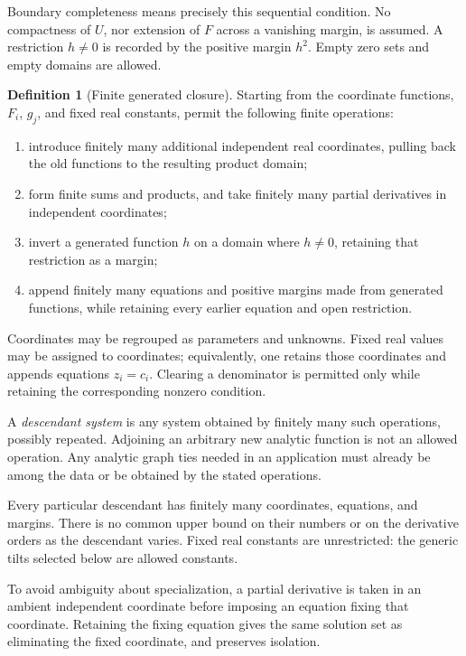 \documentclass[11pt]{article}
\theoremstyle{definition}
\newtheorem{definition}[theorem]{Definition}
\theoremstyle{remark}
\begin{document}
Boundary completeness means precisely this sequential condition.
No compactness of \(U\), nor extension of \(F\) across a vanishing
margin, is assumed. A restriction \(h\ne0\) is recorded by the
positive margin \(h^2\). Empty zero sets and empty domains are allowed.

\begin{definition}[Finite generated closure]
\label{def:closure}
Starting from the coordinate functions, \(F_i\), \(g_j\), and fixed
real constants, permit the following finite operations:
\begin{enumerate}[label=(\alph*),leftmargin=*]
\item introduce finitely many additional independent real coordinates,
pulling back the old functions to the resulting product domain;
\item form finite sums and products, and take finitely many partial
derivatives in independent coordinates;
\item invert a generated function \(h\) on a domain where \(h\ne0\),
retaining that restriction as a margin;
\item append finitely many equations and positive margins made from
generated functions, while retaining every earlier equation and open
restriction.
\end{enumerate}
Coordinates may be regrouped as parameters and unknowns. Fixed real
values may be assigned to coordinates; equivalently, one retains those
coordinates and appends equations \(z_i=c_i\). Clearing a denominator
is permitted only while retaining the corresponding nonzero condition.

A \emph{descendant system} is any system obtained by finitely many such
operations, possibly repeated. Adjoining an arbitrary new analytic
function is not an allowed operation. Any analytic graph ties needed
in an application must already be among the data or be obtained by
the stated operations.
\end{definition}

Every particular descendant has finitely many coordinates, equations,
and margins. There is no common upper bound on their numbers or on the
derivative orders as the descendant varies. Fixed real constants are
unrestricted: the generic tilts selected below are allowed constants.

To avoid ambiguity about specialization, a partial derivative is taken
in an ambient independent coordinate before imposing an equation
fixing that coordinate. Retaining the fixing equation gives the same
solution set as eliminating the fixed coordinate, and preserves
isolation.
\end{document}
